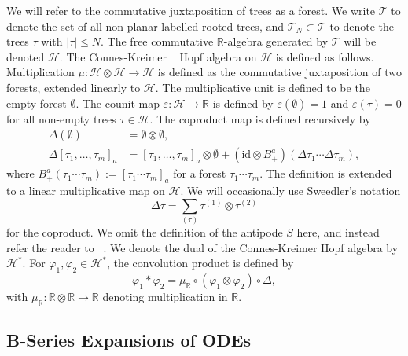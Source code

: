\documentclass{article}
\theoremstyle{definition}
\theoremstyle{remark}
\begin{document}
We will refer to the commutative juxtaposition of trees as a forest. We write $\mathcal{T}$ to denote the set of all non-planar labelled rooted trees, and $\mathcal{T}_N \subset \mathcal{T}$ to denote the trees $\tau$ with $|\tau| \leq N$. The free commutative $\mathbb{R}$-algebra generated by $\mathcal{T}$ will be denoted $\mathcal{H}$. The Connes-Kreimer ~\citep{connes1999hopf} Hopf algebra on $\mathcal{H}$ is defined as follows. Multiplication $\mu : \mathcal{H} \otimes \mathcal{H} \to \mathcal{H}$ is defined as the commutative juxtaposition of two forests, extended linearly to $\mathcal{H}$. The multiplicative unit is defined to be the empty forest $\emptyset$. The counit map $\varepsilon: \mathcal{H} \to \mathbb{R}$ is defined by $\varepsilon(\emptyset) = 1$ and $\varepsilon(\tau) = 0$ for all non-empty trees $\tau \in \mathcal{H}$. The coproduct map is defined recursively by
\begin{align*}
    \Delta(\emptyset) &= \emptyset \otimes \emptyset,\\
    \Delta [\tau_1, \ldots, \tau_m]_a &= [\tau_1, \ldots, \tau_m]_a \otimes \emptyset + (\mathrm{id} \otimes B^a_+)(\Delta \tau_1 \cdots \Delta \tau_m),
\end{align*}
where $B^a_+(\tau_1 \cdots \tau_m) := [\tau_1 \cdots \tau_m]_a$ for a forest $\tau_1 \cdots \tau_m$. The definition is extended to a linear multiplicative map on $\mathcal{H}$. We will occasionally use Sweedler's notation
\begin{equation*}
    \Delta \tau = \sum_{(\tau)} \tau^{(1)} \otimes \tau^{(2)}
\end{equation*}
for the coproduct. We omit the definition of the antipode $S$ here, and instead refer the reader to ~\citep{manchon2004hopf, hoffman2003hopf}. We denote the dual of the Connes-Kreimer Hopf algebra by $\mathcal{H}^*$. For $\varphi_1, \varphi_2 \in \mathcal{H}^*$, the convolution product is defined by
\begin{equation*}
    \varphi_1 * \varphi_2 = \mu_\mathbb{R} \circ (\varphi_1 \otimes \varphi_2) \circ \Delta,
\end{equation*}
with $\mu_\mathbb{R} : \mathbb{R} \otimes \mathbb{R} \to \mathbb{R}$ denoting multiplication in $\mathbb{R}$.

\subsection{B-Series Expansions of ODEs}\label{appendix:b_series_ode}
\end{document}

